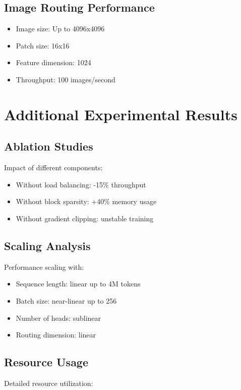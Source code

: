 \documentclass[10pt]{article}
\begin{document}
\subsection{Image Routing Performance}
\begin{itemize}
    \item Image size: Up to 4096x4096
    \item Patch size: 16x16
    \item Feature dimension: 1024
    \item Throughput: 100 images/second
\end{itemize}

\section{Additional Experimental Results}

\subsection{Ablation Studies}
Impact of different components:

\begin{itemize}
    \item Without load balancing: -15\% throughput
    \item Without block sparsity: +40\% memory usage
    \item Without gradient clipping: unstable training
\end{itemize}

\subsection{Scaling Analysis}
Performance scaling with:

\begin{itemize}
    \item Sequence length: linear up to 4M tokens
    \item Batch size: near-linear up to 256
    \item Number of heads: sublinear
    \item Routing dimension: linear
\end{itemize}

\subsection{Resource Usage}
Detailed resource utilization:
\end{document}
